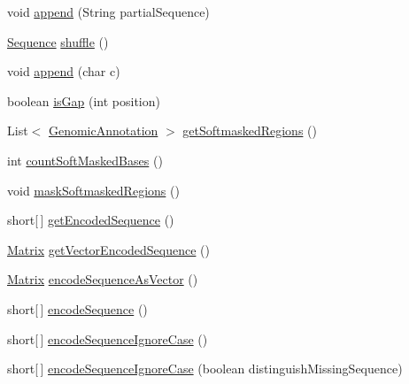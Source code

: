 \begin{DoxyCompactItemize}
\item 
void \hyperlink{classbroad_1_1core_1_1sequence_1_1_sequence_a379924f23d5ae365ec12c894e36b588f}{append} (String partial\+Sequence)
\item 
\hyperlink{classbroad_1_1core_1_1sequence_1_1_sequence}{Sequence} \hyperlink{classbroad_1_1core_1_1sequence_1_1_sequence_a8434722abf884dd505dab97058388e9f}{shuffle} ()
\item 
void \hyperlink{classbroad_1_1core_1_1sequence_1_1_sequence_a62d13ed978223eb3941863c0c3d862bf}{append} (char c)
\item 
boolean \hyperlink{classbroad_1_1core_1_1sequence_1_1_sequence_a0311924cfc4add3eee42b023f71b42c8}{is\+Gap} (int position)
\item 
List$<$ \hyperlink{interfacebroad_1_1core_1_1annotation_1_1_genomic_annotation}{Genomic\+Annotation} $>$ \hyperlink{classbroad_1_1core_1_1sequence_1_1_sequence_a61503379b2f74c904e0a6d26f8829086}{get\+Softmasked\+Regions} ()
\item 
int \hyperlink{classbroad_1_1core_1_1sequence_1_1_sequence_a7832688b204b920fb48642f144c95606}{count\+Soft\+Masked\+Bases} ()
\item 
void \hyperlink{classbroad_1_1core_1_1sequence_1_1_sequence_a2cbe31f56aa039cf1721466398346e1c}{mask\+Softmasked\+Regions} ()
\item 
short\mbox{[}$\,$\mbox{]} \hyperlink{classbroad_1_1core_1_1sequence_1_1_sequence_a67016a0976b792c79d5362da0dd58b11}{get\+Encoded\+Sequence} ()
\item 
\hyperlink{class_jama_1_1_matrix}{Matrix} \hyperlink{classbroad_1_1core_1_1sequence_1_1_sequence_a5127ade0f481eedbb87cdd6fde86f293}{get\+Vector\+Encoded\+Sequence} ()
\item 
\hyperlink{class_jama_1_1_matrix}{Matrix} \hyperlink{classbroad_1_1core_1_1sequence_1_1_sequence_a6cb973918c764e58bd548edf6bbbae37}{encode\+Sequence\+As\+Vector} ()
\item 
short\mbox{[}$\,$\mbox{]} \hyperlink{classbroad_1_1core_1_1sequence_1_1_sequence_a22f71841d3eeb8f7cbb2f2bc79deb87c}{encode\+Sequence} ()
\item 
short\mbox{[}$\,$\mbox{]} \hyperlink{classbroad_1_1core_1_1sequence_1_1_sequence_ac96afc282dcba4a583d8cfca192155dd}{encode\+Sequence\+Ignore\+Case} ()
\item 
short\mbox{[}$\,$\mbox{]} \hyperlink{classbroad_1_1core_1_1sequence_1_1_sequence_a2dde760c8a5bf338456dbfbadac40f8b}{encode\+Sequence\+Ignore\+Case} (boolean distinguish\+Missing\+Sequence)
\item 

\end{DoxyCompactItemize}
